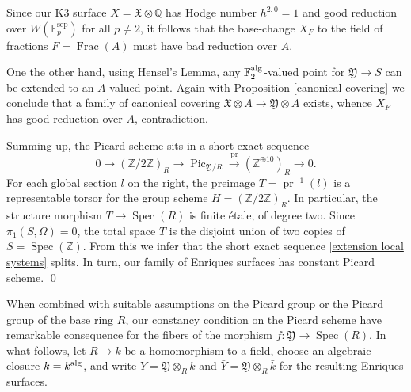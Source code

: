 \documentclass[oneside, 12pt]{amsart}
\newtheorem{proposition}[theorem]{Proposition}
\newtheorem{corollary}[theorem]{Corollary}
\theoremstyle{definition}
\theoremstyle{remark}
\newcommand{\ZZ}{\mathbb{Z}}
\newcommand{\QQ}{\mathbb{Q}}
\newcommand{\FF}{\mathbb{F}}
\newcommand{\foX}{\mathfrak{X}}
\newcommand{\foY}{\mathfrak{Y}}
\newcommand{\alg}{\text{\rm alg}}
\newcommand{\Br}{\operatorname{Br}}
\newcommand{\Frac}{\operatorname{Frac}}
\newcommand{\lra}{\longrightarrow}
\newcommand{\Pic}{\operatorname{Pic}}
\newcommand{\pr}{\operatorname{pr}}
\newcommand{\ra}{\rightarrow}
\newcommand{\sep}{{\operatorname{sep}}}
\newcommand{\Spec}{\operatorname{Spec}}
\newcommand{\bk}{{\bar{k}}}
\newcommand{\bY}{{\bar{Y}}}
\begin{document}
Since our K3 surface $X=\foX\otimes\QQ$ has Hodge number $h^{2,0}=1$ and   good reduction over   $W(\FF_p^\sep)$ for all $p\neq 2$, it follows that 
the base-change $X_F$ to the field of fractions $F=\Frac(A)$ 
must have bad reduction over $A$. 

One the other hand, using Hensel's Lemma, any $\FF_2^\alg$-valued point for $\foY\ra S$ can be extended to an $A$-valued point.
Again with Proposition \ref{canonical covering} we conclude that a family of canonical covering  $\foX\otimes A\ra\foY\otimes A$ exists,
whence $X_F$ has good reduction over $A$, contradiction.

Summing up, the Picard scheme sits in  a short exact sequence
\begin{equation}
\label{extension local systems}
0\lra (\ZZ/2\ZZ)_R\lra \Pic_{\foY/R}\stackrel{\pr}{\lra} (\ZZ^{\oplus 10})_R\lra 0.
\end{equation}
For each global section $l$ on the right, the preimage $T=\pr^{-1}(l)$ is a representable torsor for
the group scheme $H=(\ZZ/2\ZZ)_R$. In particular, the structure morphism $T\ra \Spec(R)$ is finite
\'etale, of degree two. Since $\pi_1(S,\Omega)=0$, the total space $T$ is the disjoint union of two copies
of $S=\Spec(\ZZ)$. From this we infer that the short exact sequence \eqref{extension local systems} splits.
In turn, our family of Enriques surfaces has constant Picard scheme.
\qed

\medskip
When combined with suitable assumptions
on the Picard group or the Picard group of the base ring $R$, our constancy condition
on   the Picard scheme have remarkable consequence for the fibers of the
morphism $f:\foY\ra\Spec(R)$.
In what follows, let $R\ra k$ be a homomorphism
to a field, choose   an algebraic closure $\bk=k^\alg$,
and write  $Y=\foY\otimes_Rk$  and $\bY=\foY\otimes_R \bk$ for the resulting Enriques surfaces.

\end{document}

